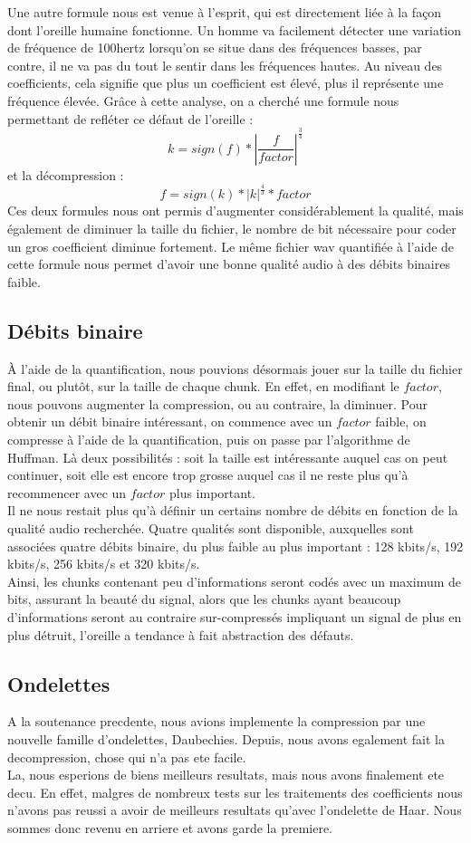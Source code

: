 \documentclass[a4paper,12pt]{report}
\begin{document}
Une autre formule nous est venue à l'esprit, qui est directement liée à la façon
dont l'oreille humaine fonctionne. Un homme va facilement détecter une variation
de fréquence de 100hertz lorsqu'on se situe dans des fréquences basses, par
contre, il ne va pas du tout le sentir dans les fréquences hautes. Au niveau des
coefficients, cela signifie que plus un coefficient est élevé, plus il
représente une fréquence élevée. Grâce à cette analyse, on a cherché une formule
nous permettant de refléter ce défaut de l'oreille :
$$ k = sign\left(f\right) * \left|\frac{f}{factor}\right|^{\frac{3}{4}}$$
et la décompression :
$$ f = sign\left(k\right) * \left|k\right|^{\frac{4}{3}} * factor$$
Ces deux formules nous ont permis d'augmenter considérablement la qualité, mais
également de diminuer la taille du fichier, le nombre de bit nécessaire pour
coder un gros coefficient diminue fortement. Le même fichier wav quantifiée à
l'aide de cette formule nous permet d'avoir une bonne qualité audio à des débits
binaires faible.
\subsection{Débits binaire}
À l'aide de la quantification, nous pouvions désormais jouer sur la taille du
fichier final, ou plutôt, sur la taille de chaque chunk. En effet, en modifiant
le $factor$, nous pouvons augmenter la compression, ou au contraire, la
diminuer. Pour obtenir un débit binaire intéressant, on commence avec un
$factor$ faible, on compresse à l'aide de la quantification, puis on passe par
l'algorithme de Huffman. Là deux possibilités : soit la taille est intéressante
auquel cas on peut continuer, soit elle est encore trop grosse auquel cas il ne
reste plus qu'à recommencer avec un $factor$ plus important.\\
Il ne nous restait plus qu'à définir un certains nombre de débits en fonction de
la qualité audio recherchée. Quatre qualités sont disponible, auxquelles sont
associées quatre débits binaire, du plus faible au plus important : 128 kbits/s,
192 kbits/s, 256 kbits/s et 320 kbits/s.\\
Ainsi, les chunks contenant peu d'informations seront codés avec un maximum de
bits, assurant la beauté du signal, alors que les chunks ayant beaucoup
d'informations seront au contraire sur-compressés impliquant un signal de plus
en plus détruit, l'oreille a tendance à fait abstraction des défauts.
\subsection{Ondelettes}
A la soutenance precdente, nous avions implemente la compression par
une nouvelle famille d'ondelettes, Daubechies. Depuis, nous avons
egalement fait la decompression, chose qui n'a pas ete facile.\\
La, nous esperions de biens meilleurs resultats, mais nous
avons finalement ete decu. En effet, malgres de nombreux tests sur les
traitements des coefficients nous n'avons pas reussi a avoir de
meilleurs resultats qu'avec l'ondelette de Haar. Nous sommes donc
revenu en arriere et avons garde la premiere.
\end{document}
